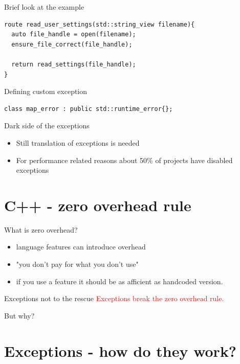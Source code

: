 \documentclass[10pt]{beamer}
\begin{document}
\begin{frame}[fragile]{Brief look at the example}
	\begin{verbatim}
route read_user_settings(std::string_view filename){
  auto file_handle = open(filename);
  ensure_file_correct(file_handle);

  return read_settings(file_handle);
}
	\end{verbatim}
\end{frame}

\begin{frame}[fragile]{Defining custom exception}
	\begin{verbatim}
class map_error : public std::runtime_error{};
	\end{verbatim}
\end{frame}

\begin{frame}[fragile]{Dark side of the exceptions}
	\begin{itemize}[<+- | alert@+>]
		\item Still translation of exceptions is needed
		\item For performance related reasons about 50\% of projects have disabled exceptions
	\end{itemize}
\end{frame}

\section{C++ - zero overhead rule}

\begin{frame}{What is zero overhead?}
	\begin{itemize}[<+- | alert@+>]
		\item language features {\color{amethyst}can} introduce overhead
		\item "you don't pay for what you don't use"
		\item if you use a feature it should be as afficient as handcoded version.
	\end{itemize}
\end{frame}

\begin{frame}{Exceptions not to the rescue}
		\centering
		\textcolor{red}{Exceptions break the zero overhead rule.}
		
		But why?
\end{frame}

\section{Exceptions - how do they work?}
\end{document}
